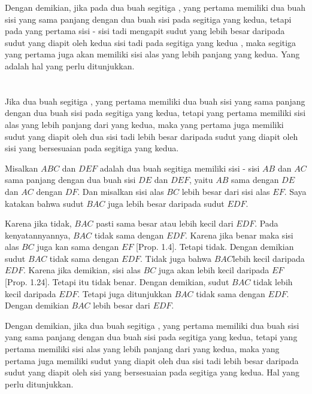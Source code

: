 \documentclass[a4paper]{book}
\begin{document}
Dengan demikian, jika pada dua buah segitiga , yang pertama memiliki 
dua buah sisi yang sama panjang  dengan dua buah sisi pada segitiga yang 
kedua, tetapi pada yang pertama sisi - sisi tadi mengapit sudut yang 
lebih besar daripada sudut yang diapit oleh kedua sisi tadi pada segitiga 
yang kedua , maka segitiga yang pertama juga akan memiliki sisi alas 
yang lebih panjang yang kedua. Yang adalah hal yang perlu ditunjukkan.

\section*{\centering \thesection}
Jika dua buah segitiga , yang pertama memiliki dua buah sisi yang
sama panjang dengan dua buah sisi pada segitiga yang kedua, tetapi
yang pertama memiliki sisi alas yang lebih panjang dari yang kedua, 
maka yang pertama juga memiliki sudut yang diapit oleh dua sisi tadi
lebih besar daripada sudut yang diapit oleh sisi yang bersesuaian 
pada segitiga yang kedua.
\begin{center}
\end{center}

Misalkan $ABC$ dan $DEF$ adalah dua buah segitiga memiliki sisi - sisi
$AB$ dan $AC$ sama panjang dengan dua buah sisi $DE$ dan $DEF$, yaitu
$AB$ sama dengan $DE$ dan $AC$ dengan $DF$. Dan misalkan sisi alas $BC$
lebih besar dari sisi alas $EF$. Saya katakan bahwa sudut $BAC$ juga lebih
besar daripada sudut $EDF$.

Karena jika tidak, $BAC$ pasti sama besar atau lebih kecil dari $EDF$. Pada 
kenyatannyannya, $BAC$ tidak sama dengan $EDF$. Karena jika benar maka sisi
alas $BC$ juga kan sama dengan $EF$ [Prop. 1.4]. Tetapi tidak. Dengan demikian
sudut $BAC$ tidak sama dengan $EDF$. Tidak juga bahwa $BAC $lebih kecil 
daripada $EDF$. Karena jika demikian, sisi alas $BC$ juga akan lebih
kecil daripada $EF$ [Prop. 1.24]. Tetapi itu tidak benar. Dengan demikian, 
sudut $BAC$ tidak lebih kecil daripada $EDF$. Tetapi juga ditunjukkan $BAC$
tidak sama dengan $EDF$. Dengan demikian $BAC$ lebih besar dari $EDF$.

Dengan demikian, jika dua buah segitiga , yang pertama memiliki dua buah sisi 
yang sama panjang dengan dua buah sisi pada segitiga yang kedua, tetapi
yang pertama memiliki sisi alas yang lebih panjang dari yang kedua, 
maka yang pertama juga memiliki sudut yang diapit oleh dua sisi tadi
lebih besar daripada sudut yang diapit oleh sisi yang bersesuaian 
pada segitiga yang kedua. Hal yang perlu ditunjukkan.
\end{document}
